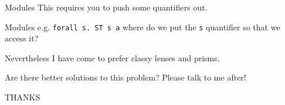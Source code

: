 \begin{frame}[fragile]
\begin{block}{Modules}
This requires you to push some quantifiers out.
\end{block}
\end{frame}

\begin{frame}[fragile]
\begin{block}{Modules}
e.g. \lstinline{forall s. ST s a} where do we put the \lstinline{s} quantifier so that we access it?
\end{block}
\end{frame}

\begin{frame}[fragile]
\begin{block}{Nevertheless}
I have come to prefer classy lenses and prisms.
\end{block}
\end{frame}

\begin{frame}[fragile]
\begin{block}{}
Are there better solutions to this problem? Please talk to me after!
\end{block}
\end{frame}

\begin{frame}[fragile]
\begin{center}
THANKS
\end{center}
\end{frame}
